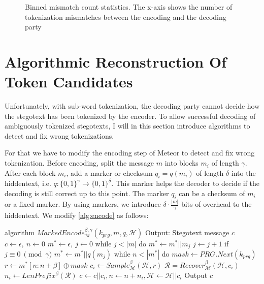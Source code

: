 \begin{figure}[htbp]
	\centering
	
	\caption{Binned mismatch count statistics. The x-axis shows the number of tokenization mismatches between the encoding and the decoding party}
	\label{fig:meteor-stats-mismatch-count}
\end{figure}



\section{Algorithmic Reconstruction Of Token Candidates}
\label{sec:alg-rec-tok-candidates}

Unfortunately, with sub-word tokenization, the decoding party cannot decide how the stegotext has been tokenized by the encoder.
To allow successful decoding of ambiguously tokenized stegotexts, I will in this section introduce algorithms to detect and fix wrong tokenizations. 


For that we have to modify the encoding step of Meteor to detect and fix wrong tokenization.
Before encoding, split the message $m$ into blocks $m_i$ of length $\gamma$.
After each block $m_i$, add a marker or checksum $q_i = q(m_i)$ of length $\delta$ into the hiddentext, i.e. $q \colon \{ 0,1 \}^\gamma \rightarrow \{ 0,1 \}^\delta$.
This marker helps the decoder to decide if the decoding is still correct up to this point.
The marker $q_i$ can be a checksum of $m_i$ or a fixed marker.
By using markers, we introduce $\delta \cdot \frac{|m|}{\gamma}$ bits of overhead to the hiddentext.
We modify \autoref{alg:encode} as follows:

\begin{Pseudocode}[float, caption={Marked Encode Algorithm}, label={alg:marked-encode}]
algorithm $MarkedEncode_{\mathcal{M}}^{\beta, \gamma}(k_{prg}, m, q, \mathcal{H})$
	Output: Stegotext message $c$
	$c \leftarrow \epsilon,~ n \leftarrow 0$
	$m^* \leftarrow \epsilon,~ j \leftarrow 0$
	while $j < |m|$ do
		$m^* \leftarrow m^* || m_j$
		$j \leftarrow j + 1$
		if $j \equiv 0~ \pmod \gamma$
			$m^* \leftarrow m^* || q(m_j)$
	while $n < |m^*|$ do
		$mask \leftarrow PRG.Next(k_{prg})$
		$r \leftarrow m^*[n:n+\beta] \oplus mask$
		$c_i \leftarrow Sample_{\mathcal{M}}^\beta(\mathcal{H}, r)$
		$\mathcal{R} = Recover_{\mathcal{M}}^\beta(\mathcal{H}, c_i)$
		$n_i \leftarrow LenPrefix^\beta(\mathcal{R})$
		$c \leftarrow c || c_i, n \leftarrow n+n_i, \mathcal{H} \leftarrow \mathcal{H}||c_i$
	Output $c$
\end{Pseudocode}

